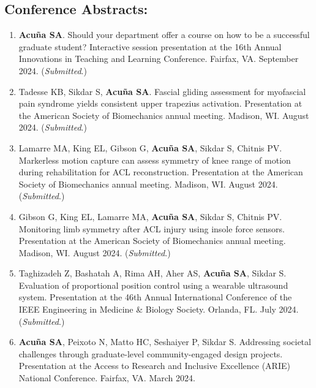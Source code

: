 \documentclass[letterpaper, 10pt]{article}
\begin{document}
\subsection{Conference Abstracts:} %
\begin{enumerate}
    \item \textbf{Acuña SA}. Should your department offer a course on how to be a successful graduate student? Interactive session presentation at the 16th Annual Innovations in Teaching and Learning Conference. Fairfax, VA. September 2024. (\textit{Submitted}.)
    \item Tadesse KB, Sikdar S, \textbf{Acuña SA}. Fascial gliding assessment for myofascial pain syndrome yields consistent upper trapezius activation. Presentation at the American Society of Biomechanics annual meeting. Madison, WI. August 2024. (\textit{Submitted}.)
    \item Lamarre MA, King EL, Gibson G, \textbf{Acuña SA}, Sikdar S, Chitnis PV. Markerless motion capture can assess symmetry of knee range of motion during rehabilitation for ACL reconstruction. Presentation at the American Society of Biomechanics annual meeting. Madison, WI. August 2024. (\textit{Submitted}.)
    \item Gibson G, King EL, Lamarre MA, \textbf{Acuña SA}, Sikdar S, Chitnis PV. Monitoring limb symmetry after ACL injury using insole force sensors. Presentation at the American Society of Biomechanics annual meeting. Madison, WI. August 2024. (\textit{Submitted}.)   
    \item Taghizadeh Z, Bashatah A, Rima AH, Aher AS, \textbf{Acuña SA}, Sikdar S. Evaluation of proportional position control using a wearable ultrasound system. Presentation at the 46th Annual International Conference of the IEEE Engineering in Medicine \& Biology Society. Orlanda, FL. July 2024. (\textit{Submitted}.)
    \item \textbf{Acuña SA}, Peixoto N, Matto HC, Seshaiyer P, Sikdar S. Addressing societal challenges through graduate-level community-engaged design projects. Presentation at the Access to Research and Inclusive Excellence (ARIE) National Conference. Fairfax, VA. March 2024.

\end{enumerate}
\end{document}

